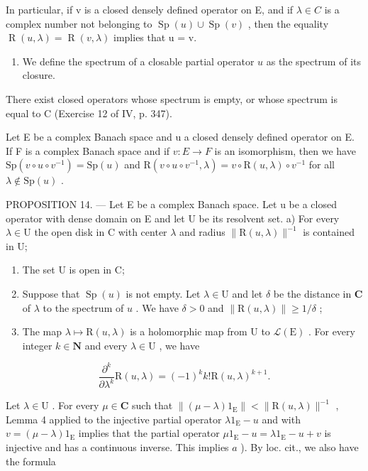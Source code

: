 In particular, if v is a closed densely defined operator on E, and if \(\lambda \in C\) is a complex number not belonging to \(\operatorname{Sp}(u) \cup \operatorname{Sp}(v)\) , then the equality \(\operatorname{R}(u, \lambda) = \operatorname{R}(v, \lambda)\) implies that u = v.

\begin{enumerate}
\def\labelenumi{\arabic{enumi})}
\setcounter{enumi}{5}
\tightlist
\item
  We define the spectrum of a closable partial operator \(u\) as the spectrum of its closure.
\end{enumerate}

There exist closed operators whose spectrum is empty, or whose spectrum is equal to C (Exercise 12 of IV, p. 347).

Let E be a complex Banach space and u a closed densely defined operator on E. If F is a complex Banach space and if \(v: E \to F\) is an isomorphism, then we have \(\mathrm{Sp}(v \circ u \circ v^{-1}) = \mathrm{Sp}(u)\) and \(\mathrm{R}(v \circ u \circ v^{-1}, \lambda) = v \circ \mathrm{R}(u, \lambda) \circ v^{-1}\) for all \(\lambda \notin \mathrm{Sp}(u)\) .

PROPOSITION 14. --- Let E be a complex Banach space. Let u be a closed operator with dense domain on E and let U be its resolvent set. a) For every \(\lambda\in\mathrm{U}\) the open disk in C with center \(\lambda\) and radius \(\|\mathrm{R}(u,\lambda)\|^{-1}\) is contained in U;

\begin{enumerate}
\def\labelenumi{\alph{enumi})}
\setcounter{enumi}{1}
\item
  The set U is open in C;
\item
  Suppose that \(\operatorname{Sp}(u)\) is not empty. Let \(\lambda \in \mathrm{U}\) and let \(\delta\) be the distance in \(\mathbf{C}\) of \(\lambda\) to the spectrum of \(u\) . We have \(\delta > 0\) and \(\| \mathrm{R}(u, \lambda) \| \geqslant 1 / \delta\) ;
\item
  The map \(\lambda \mapsto \mathrm{R}(u,\lambda)\) is a holomorphic map from U to \(\mathcal{L}(\mathrm{E})\) . For every integer \(k\in \mathbf{N}\) and every \(\lambda \in \mathrm{U}\) , we have
\end{enumerate}

\[
\frac {\partial^ {k}}{\partial \lambda^ {k}} \mathrm{R} (u, \lambda) = (- 1) ^ {k} k! \mathrm{R} (u, \lambda) ^ {k + 1}.
\]

Let \(\lambda \in \mathrm{U}\) . For every \(\mu \in \mathbf{C}\) such that \(\| (\mu -\lambda)1_{\mathrm{E}}\| < \| \mathrm{R}(u,\lambda)\|^{-1}\) , Lemma 4 applied to the injective partial operator \(\lambda 1_{\mathrm{E}} - u\) and with \(v = (\mu -\lambda)1_{\mathrm{E}}\) implies that the partial operator \(\mu 1_{\mathrm{E}} - u = \lambda 1_{\mathrm{E}} - u + v\) is injective and has a continuous inverse. This implies \(a\) ). By loc. cit., we also have the formula

